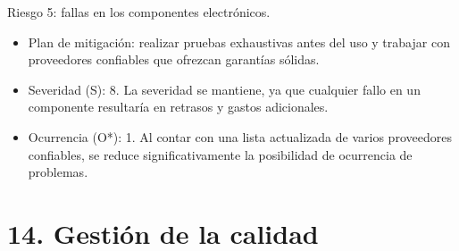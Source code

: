 \documentclass[
11pt, %
]{charter}
\begin{document}
Riesgo 5: fallas en los componentes electrónicos.
\begin{itemize}
	\item Plan de mitigación: realizar pruebas exhaustivas antes del uso y trabajar con proveedores confiables que ofrezcan garantías sólidas.	
	\item Severidad (S): 8. La severidad se mantiene, ya que cualquier fallo en un componente resultaría en retrasos y gastos adicionales.
	\item Ocurrencia (O*): 1. Al contar con una lista actualizada de varios proveedores confiables, se reduce significativamente la posibilidad de ocurrencia de problemas.
\end{itemize}


\section{14. Gestión de la calidad}
\label{sec:calidad}
\end{document}
